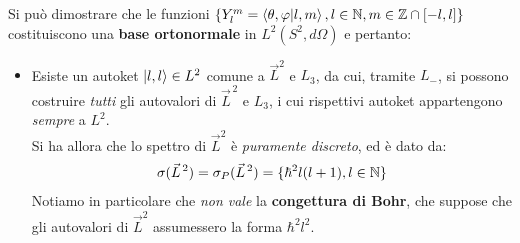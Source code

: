 \documentclass[../../FisicaTeorica.tex]{subfiles}
\begin{document}
Si può dimostrare che le funzioni $\{Y^m_l = \braket{\theta,\varphi|l,m}, l\in \mathbb{N}, m\in \mathbb{Z}\cap [-l,l]\}$ costituiscono una \textbf{base ortonormale} in $L^2(S^2, d\Omega)$ e pertanto:
\begin{itemize}
\item Esiste un autoket $\ket{l,l} \in L^2$ comune a $\vec{L}^2$ e $L_3$, da cui, tramite $L_-$, si possono costruire \textit{tutti} gli autovalori di $\vec{L}^{\,2}$ e $L_3$, i cui rispettivi autoket appartengono \textit{sempre} a $L^2$.\\
Si ha allora che lo spettro di $\vec{L}^2$ è \textit{puramente discreto}, ed è dato da:
\begin{align*}
\sigma(\vec{L}^{\,2})=\sigma_P(\vec{L}^{\,2}) = \{\hbar^2 l(l+1), l\in \mathbb{N}\}
\end{align*}
Notiamo in particolare che \textit{non vale} la \textbf{congettura di Bohr}, che suppose che gli autovalori di $\vec{L}^2$ assumessero la forma $\hbar^2 l^2$.\\


\end{itemize}
\end{document}
